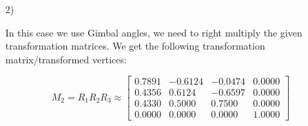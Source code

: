 \documentclass[a4paper,11pt]{article}
\begin{document}
\begin {enumerate}
\begin{enumerate}
            In this case we use Euler angles, so we need to left multiply the
            given transformation matrices. We get the following transformation
            matrix/transformed vertices:

        $$M_1 = R_3 R_2 R_1 \approx \begin{bmatrix}
            0.4356 & -0.7891 & -0.4330 & 0 \\
            0.6124 &  0.6124 & -0.5 & 0 \\
            0.6597 & -0.0474 &  0.75 & 0 \\
            0 & 0 & 0 & 1
        \end{bmatrix}$$

        $$
            A_1 \approx \begin{pmatrix}1.7678 \\ -6.1237 \\ -3.0619\end{pmatrix}
            B_1 \approx \begin{pmatrix}6.1237 \\ -0.0000 \\ 3.5355\end{pmatrix}
            C_1 \approx \begin{pmatrix}-1.7678 \\ 6.1237 \\ 3.0619\end{pmatrix}
            D_1 \approx \begin{pmatrix}-6.1237 \\ 0.0000 \\ -3.5355\end{pmatrix}
            E_1 \approx \begin{pmatrix}-12.9904 \\ -15.0000 \\ 22.5000\end{pmatrix}
        $$


        \item[2)]

            In this case we use Gimbal angles, we need to right multiply the
            given transformation matrices. We get the following transformation
            matrix/transformed vertices:

        $$M_2 = R_1 R_2 R_3 \approx \begin{bmatrix}
            0.7891 & -0.6124 & -0.0474 & 0.0000\\
            0.4356 & 0.6124 & -0.6597 & 0.0000\\
            0.4330 & 0.5000 & 0.7500 & 0.0000\\
            0.0000 & 0.0000 & 0.0000 & 1.0000
        \end{bmatrix}$$


\end{enumerate}
\end{enumerate}
\end{document}
